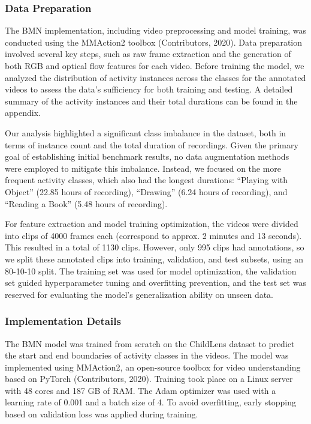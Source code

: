 \documentclass[
  man,floatsintext]{apa6}
\begin{document}
\subsubsection{Data Preparation}\label{data-preparation}

The BMN implementation, including video preprocessing and model training, was conducted using the MMAction2 toolbox (Contributors, 2020). Data preparation involved several key steps, such as raw frame extraction and the generation of both RGB and optical flow features for each video. Before training the model, we analyzed the distribution of activity instances across the classes for the annotated videos to assess the data's sufficiency for both training and testing. A detailed summary of the activity instances and their total durations can be found in the appendix.

Our analysis highlighted a significant class imbalance in the dataset, both in terms of instance count and the total duration of recordings. Given the primary goal of establishing initial benchmark results, no data augmentation methods were employed to mitigate this imbalance. Instead, we focused on the more frequent activity classes, which also had the longest durations: ``Playing with Object'' (22.85 hours of recording), ``Drawing'' (6.24 hours of recording), and ``Reading a Book'' (5.48 hours of recording).

For feature extraction and model training optimization, the videos were divided into clips of 4000 frames each (correspond to approx. 2 minutes and 13 seconds). This resulted in a total of 1130 clips. However, only 995 clips had annotations, so we split these annotated clips into training, validation, and test subsets, using an 80-10-10 split. The training set was used for model optimization, the validation set guided hyperparameter tuning and overfitting prevention, and the test set was reserved for evaluating the model's generalization ability on unseen data.

\subsubsection{Implementation Details}\label{implementation-details}

The BMN model was trained from scratch on the ChildLens dataset to predict the start and end boundaries of activity classes in the videos. The model was implemented using MMAction2, an open-source toolbox for video understanding based on PyTorch (Contributors, 2020). Training took place on a Linux server with 48 cores and 187 GB of RAM. The Adam optimizer was used with a learning rate of 0.001 and a batch size of 4. To avoid overfitting, early stopping based on validation loss was applied during training.
\end{document}

